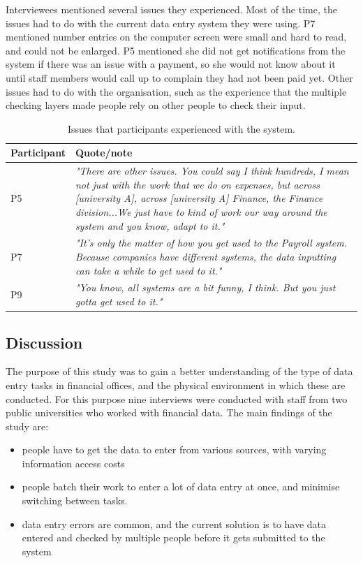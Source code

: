 \documentclass[11pt,oneside]{report}
\begin{document}
Interviewees mentioned several issues they experienced. Most of the time, the issues had to do with the current data entry system they were using. P7 mentioned number entries on the computer screen were small and hard to read, and could not be enlarged. P5 mentioned she did not get notifications from the system if there was an issue with a payment, so she would not know about it until staff members would call up to complain they had not been paid yet.  Other issues had to do with the organisation, such as the experience that the multiple checking layers made people rely on other people to check their input.

\begin{table}[htp]
\centering
    \begin{tabular}{ | l | p{10cm} |}
    \hline
     \textbf{Participant} & \textbf{Quote/note} \\ \hline
    P5 &  \textit{"There are other issues. You could say I think hundreds, I mean not just with the work that we do on expenses, but across [university A], across [university A] Finance, the Finance division...We just have to kind of work our way around the system and you know, adapt to it."} \\ \hline
    P7 & \textit{"It's only the matter of how you get used to the Payroll system. Because companies have different systems, the data inputting can take a while to get used to it."} \\ \hline
    P9 &  \textit{"You know, all systems are a bit funny, I think. But you just gotta get used to it."} \\ \hline
    \end{tabular}
    \caption{Issues that participants experienced with the system.}
    \label{table:ch3_otherquotes}
\end{table}%

\pagebreak

\subsection{Discussion}
The purpose of this study was to gain a better understanding of the type of data entry tasks in financial offices, and the physical environment in which these are conducted. For this purpose nine interviews were conducted with staff from two public universities who worked with financial data. The main findings of the study are: 

\begin{itemize}
\item 
people have to get the data to enter from various sources, with varying information access costs
\item 
people batch their work to enter a lot of data entry at once, and minimise switching between tasks. 
\item 
data entry errors are common, and the current solution is to have data entered and checked by multiple people before it gets submitted to the system
\end{itemize}
\end{document}
